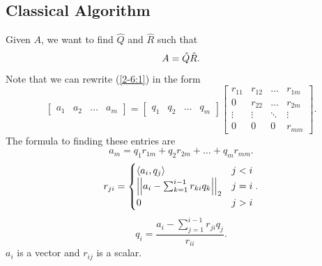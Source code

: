 \documentclass[letterpaper]{article}
\newcommand{\0}{\mathbf{0}}
\begin{document}
\subsection{Classical Algorithm}
Given $A$, we want to find $\hat{Q}$ and $\hat{R}$ such that 
\begin{equation}{\label{2-6:1}}
    A = \hat{Q}\hat{R}.
\end{equation} Note that we can rewrite ({\ref{2-6:1}}) in the form 
\[\begin{bmatrix}
    a_1 & a_2 & \hdots & a_m
\end{bmatrix} = \begin{bmatrix}
    q_1 & q_2 & \hdots & q_m
\end{bmatrix} \begin{bmatrix}
    r_{11} & r_{12} & \hdots & r_{1m} \\ 
    0      & r_{22} & \hdots & r_{2m} \\ 
    \vdots & \vdots & \ddots & \vdots \\ 
    0      & 0      & 0      & r_{mm} 
\end{bmatrix}.\] 
The formula to finding these entries are 
\[a_m = q_1 r_{1m} + q_2 r_{2m} + \hdots + q_m r_{mm}.\]
\[r_{ji} = \begin{cases}
    \langle a_{i}, q_{j} \rangle & j < i \\ 
    \left|\left| a_i - \sum_{k = 1}^{i - 1} r_{ki} q_k \right|\right|_2 & j = i \\ 
    0 & j > i
\end{cases}.\]
\[q_{i} = \frac{a_i - \sum_{j = 1}^{i - 1} r_{ji} q_j}{r_{ii}}.\]
$a_i$ is a vector and $r_{ij}$ is a scalar. 
\end{document}
